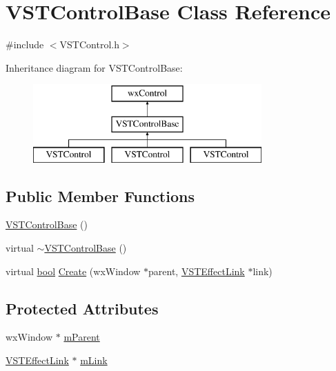\hypertarget{class_v_s_t_control_base}{}\section{V\+S\+T\+Control\+Base Class Reference}
\label{class_v_s_t_control_base}


{\ttfamily \#include $<$V\+S\+T\+Control.\+h$>$}

Inheritance diagram for V\+S\+T\+Control\+Base\+:\begin{figure}[H]
\begin{center}
\leavevmode
\includegraphics[height=3.000000cm]{class_v_s_t_control_base}
\end{center}
\end{figure}
\subsection*{Public Member Functions}
\begin{DoxyCompactItemize}
\item 
\hyperlink{class_v_s_t_control_base_acae6b6ed5b369576b020711ad50c9942}{V\+S\+T\+Control\+Base} ()
\item 
virtual \hyperlink{class_v_s_t_control_base_a15717ad589970096cd5c59564b2c8097}{$\sim$\+V\+S\+T\+Control\+Base} ()
\item 
virtual \hyperlink{mac_2config_2i386_2lib-src_2libsoxr_2soxr-config_8h_abb452686968e48b67397da5f97445f5b}{bool} \hyperlink{class_v_s_t_control_base_a2d4981bff3657c7ccd2bb288cbd6c125}{Create} (wx\+Window $\ast$parent, \hyperlink{class_v_s_t_effect_link}{V\+S\+T\+Effect\+Link} $\ast$link)
\end{DoxyCompactItemize}
\subsection*{Protected Attributes}
\begin{DoxyCompactItemize}
\item 
wx\+Window $\ast$ \hyperlink{class_v_s_t_control_base_a3e31638c55ccf87d12e5f46a284e74d8}{m\+Parent}
\item 
\hyperlink{class_v_s_t_effect_link}{V\+S\+T\+Effect\+Link} $\ast$ \hyperlink{class_v_s_t_control_base_a883e6b7706a25fde380a03dbfd99ee35}{m\+Link}
\end{DoxyCompactItemize}


